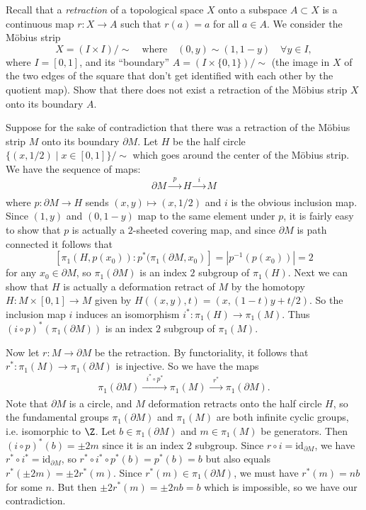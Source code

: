 \documentclass[11pt,letterpaper]{article}
\begin{document}
\begin{problem}
    Recall that a {\em retraction} of a topological space $X$ onto a subspace $A\subset X$ is a continuous map $r:X\to A$ such that $r(a)=a$ for all $a\in A$. We consider the M\"obius strip $$X=(I\times I)/\sim \quad\textrm{where}\quad (0,y)\sim (1,1-y) \quad \forall y\in I,$$ where $I=[0,1]$, and its ``boundary'' $A=(I\times \{0,1\})/\!\sim$ (the image in $X$ of the two edges of the square that don't get identified with each other by the quotient map). Show that there does not exist a retraction of the M\"obius strip $X$ onto its boundary $A$.
\end{problem}

\begin{solution}
    Suppose for the sake of contradiction that there was a retraction of the M\"obius strip $M$ onto its boundary $\partial M$. Let $H$ be the half circle $\{(x,1/2)\mid x\in [0,1]\}/\sim$ which goes around the center of the M\"obius strip. We have the sequence of maps:
    \[
        \partial M \xrightarrow[]{\;\;p\;\;} H \xrightarrow[]{\;\;i\;\;} M
    \] 
    where $p : \partial M \to H$ sends $(x,y) \mapsto (x,1/2)$ and $i$ is the obvious inclusion map. Since $(1,y)$ and $(0,1-y)$ map to the same element under $p$, it is fairly easy to show that $p$ is actually a $2$-sheeted covering map, and since $\partial M$ is path connected it follows that
    \[
        [\pi_1(H, p(x_0)) : p^*(\pi_1(\partial M, x_0)] = |p^{-1}(p(x_0))| = 2
    \] 
    for any $x_0\in \partial M$, so $\pi_1(\partial M)$ is an index $2$ subgroup of $\pi_1(H)$. Next we can show that $H$ is actually a deformation retract of $M$ by the homotopy $H : M \times [0,1] \to M$ given by $H((x,y), t) = (x,(1-t)y+t/2)$. So the inclusion map $i$ induces an isomorphism $i^* : \pi_1(H) \to \pi_1(M)$. 
    Thus $(i\circ p)^*(\pi_1(\partial M))$ is an index $2$ subgroup of $\pi_1(M)$.

    Now let $r : M \to \partial M$ be the retraction. By functoriality, it follows that $r^* : \pi_1(M) \to \pi_1(\partial M)$ is injective. So we have the maps
    \[
        \pi_1(\partial M) \xrightarrow[]{\;\;i^*\circ p^*\;\;} \pi_1(M) \xrightarrow[]{\;\;r^*\;\;} \pi_1(\partial M).
    \] 
    Note that $\partial M$ is a circle, and $M$ deformation retracts onto the half circle $H$, so the fundamental groups $\pi_1(\partial M)$ and $\pi_1(M)$ are both infinite cyclic groups, i.e. isomorphic to $\Z$. Let $b\in \pi_1(\partial M)$ and $m\in \pi_1(M)$ be generators. Then $(i\circ p)^*(b) = \pm 2m$ since it is an index $2$ subgroup. Since $r\circ i = \textrm{id}_{\partial M}$, we have $r^*\circ i^* = \textrm{id}_{\partial M}$, so $r^*\circ i^*\circ p^*(b) = p^*(b)=b$ but also equals $r^*(\pm 2m)=\pm 2r^*(m)$. Since $r^*(m)\in \pi_1(\partial M)$, we must have $r^*(m)=nb$ for some $n$. But then $\pm 2r^*(m)=\pm 2nb = b$ which is impossible, so we have our contradiction.
\end{solution}
\end{document}
